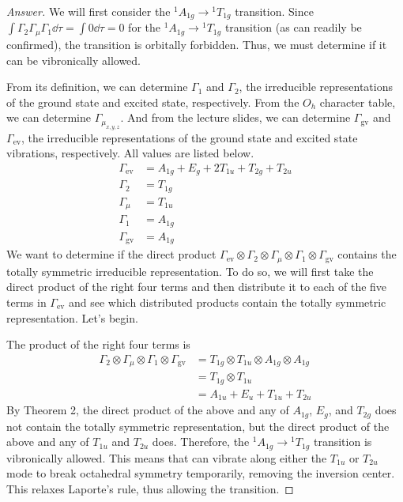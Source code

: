 \documentclass[../psets.tex]{subfiles}
\begin{document}
\begin{enumerate}[label={\Roman*)}]
    \begin{proof}[Answer]
        We will first consider the ${}^1A_{1g}\to{}^1T_{1g}$ transition. Since $\int\Gamma_2\Gamma_\mu\Gamma_1\dd{\tau}=\int 0\dd{\tau}=0$ for the ${}^1A_{1g}\to{}^1T_{1g}$ transition (as can readily be confirmed), the transition is orbitally forbidden. Thus, we must determine if it can be vibronically allowed.\par
        From its definition, we can determine $\Gamma_1$ and $\Gamma_2$, the irreducible representations of the ground state and excited state, respectively. From the $O_h$ character table, we can determine $\Gamma_{\mu_{x,y,z}}$. And from the lecture slides, we can determine $\Gamma_\text{gv}$ and $\Gamma_\text{ev}$, the irreducible representations of the ground state and excited state vibrations, respectively. All values are listed below.
        \begin{align*}
            \Gamma_\text{ev} &= A_{1g}+E_g+2T_{1u}+T_{2g}+T_{2u}\\
            \Gamma_2 &= T_{1g}\\
            \Gamma_\mu &= T_{1u}\\
            \Gamma_1 &= A_{1g}\\
            \Gamma_\text{gv} &= A_{1g}
        \end{align*}
        We want to determine if the direct product $\Gamma_\text{ev}\otimes\Gamma_2\otimes\Gamma_\mu\otimes\Gamma_1\otimes\Gamma_\text{gv}$ contains the totally symmetric irreducible representation. To do so, we will first take the direct product of the right four terms and then distribute it to each of the five terms in $\Gamma_\text{ev}$ and see which distributed products contain the totally symmetric representation. Let's begin.\par
        The product of the right four terms is
        \begin{align*}
            \Gamma_2\otimes\Gamma_\mu\otimes\Gamma_1\otimes\Gamma_\text{gv} &= T_{1g}\otimes T_{1u}\otimes A_{1g}\otimes A_{1g}\\
            &= T_{1g}\otimes T_{1u}\\
            &= A_{1u}+E_u+T_{1u}+T_{2u}
        \end{align*}
        By Theorem 2, the direct product of the above and any of $A_{1g}$, $E_g$, and $T_{2g}$ does not contain the totally symmetric representation, but the direct product of the above and any of $T_{1u}$ and $T_{2u}$ does. Therefore, the ${}^1A_{1g}\to{}^1T_{1g}$ transition is vibronically allowed. This means that  can vibrate along either the $T_{1u}$ or $T_{2u}$ mode to break octahedral symmetry temporarily, removing the inversion center. This relaxes Laporte's rule, thus allowing the transition.\par\medskip

\end{proof}
\end{enumerate}
\end{document}
